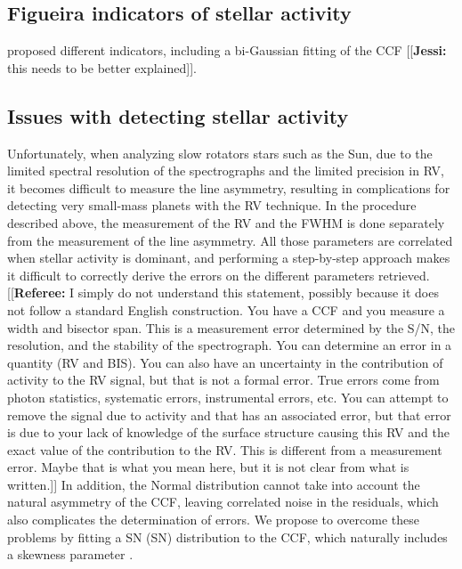 \documentclass[11pt, oneside]{article}
\newcommand{\jessi}[1]{{\color{Purple}[[\textbf{Jessi: }#1]]}}
\newcommand{\comment}[1]{{\color{red}[[\textbf{Referee: }#1]]}}
\begin{document}
{%
\subsection{Figueira indicators of stellar activity}
\citet{Figueira-2013} proposed different indicators, including a bi-Gaussian fitting of the CCF \jessi{this needs to be better explained}. 


\subsection{Issues with detecting stellar activity}
Unfortunately, when analyzing slow rotators stars such as the Sun, due to the limited spectral resolution of the spectrographs and the limited precision in RV, it becomes difficult to measure the line asymmetry, resulting in complications for detecting very small-mass planets with the RV technique.
In the procedure described above, the measurement of the RV and the FWHM is done separately from the measurement of the line asymmetry. All those parameters are correlated when stellar activity is dominant, and performing a step-by-step approach makes it difficult to correctly derive the errors on the different parameters retrieved. 
\comment{I simply do not understand this statement, possibly because it does not follow a standard English construction. You have a CCF and you measure a width and bisector span. This is a measurement error determined by the S/N, the resolution, and the stability of the spectrograph. You can determine an error in a quantity (RV and BIS). You can also have an uncertainty in the contribution of activity to the RV signal, but that is not a formal error. True errors come from photon statistics, systematic errors, instrumental errors, etc. You can attempt to remove the signal due to activity and that has an associated error, but that error is due to your lack of knowledge of the surface structure causing this RV and the exact value of the contribution to the RV. This is different from a measurement error. Maybe that is what you mean here, but it is not clear from what is written.}
In addition, the Normal distribution cannot take into account the natural asymmetry of the CCF, leaving correlated noise in the residuals, which also complicates the determination of errors. We propose to overcome these problems by fitting a SN (SN) distribution to the CCF, which naturally includes a skewness parameter \citep[][]{Azzalini1985}.


}
\end{document}
